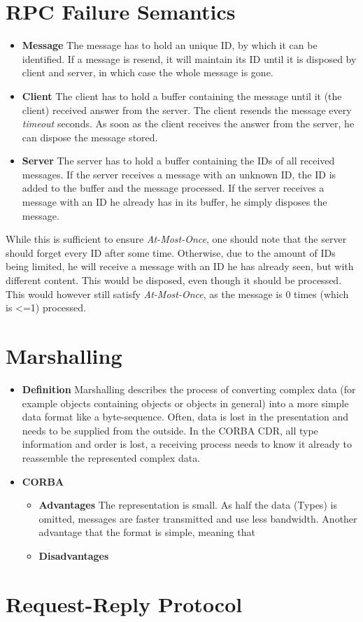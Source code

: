 \documentclass{tudexercise}
\begin{document}
	\section{RPC Failure Semantics}
		\begin{itemize}
			\item \textbf{Message} The message has to hold an unique ID, by which it can be identified. If a message is resend, it will maintain its ID until it is disposed by client and server, in which case the whole message is gone.
			\item \textbf{Client} The client has to hold a buffer containing the message until it (the client) received answer from the server. The client resends the message every \textit{timeout} seconds. As soon as the client receives the answer from the server, he can dispose the message stored.
			\item \textbf{Server} The server has to hold a buffer containing the IDs of all received messages. If the server receives a message with an unknown ID, the ID is added to the buffer and the message processed. If the server receives a message with an ID he already has in its buffer, he simply disposes the message.
		\end{itemize}
		
		While this is sufficient to ensure \textit{At-Most-Once}, one should note that the server should forget every ID after some time. Otherwise, due to the amount of IDs being limited, he will receive a message with an ID he has already seen, but with different content. This would be disposed, even though it should be processed. This would however still satisfy \textit{At-Most-Once}, as the message is 0 times (which is <=1) processed.
		
	\section{Marshalling}
		\begin{itemize}
			\item \textbf{Definition} Marshalling describes the process of converting complex data (for example objects containing objects or objects in general) into a more simple data format like a byte-sequence. Often, data is lost in the presentation and needs to be supplied from the outside. In the CORBA CDR, all type information and order is lost, a receiving process needs to know it already to reassemble the represented complex data.
			\item \textbf{CORBA}
				\begin{itemize}
					Explicit typing is not required in CORBA, as both sides know what the object transmitted is composed of and in what order this composition has to be done.
					\item \textbf{Advantages} The representation is small. As half the data (Types) is omitted, messages are faster transmitted and use less bandwidth. Another advantage that the format is simple, meaning that 
					\item \textbf{Disadvantages}
				\end{itemize}
		\end{itemize}
		
	\section{Request-Reply Protocol}
		
		
\end{document}
